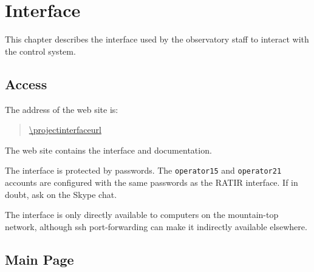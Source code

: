 \chapter{Interface}
\label{chapter:interface}

This chapter describes the interface used by the observatory staff to interact with the {\projectname} control system.

\section{Access}

The address of the {\projectname} web site is:
\begin{quotation}
\url{\projectinterfaceurl}
\end{quotation}

The web site contains the interface and documentation.

The interface is protected by passwords. The \verb|operator15| and \verb|operator21| accounts are configured with the same passwords as the RATIR interface. If in doubt, ask on the Skype chat.

The interface is only directly available to computers on the mountain-top network, although ssh port-forwarding can make it indirectly available elsewhere.

\section{Main Page}

